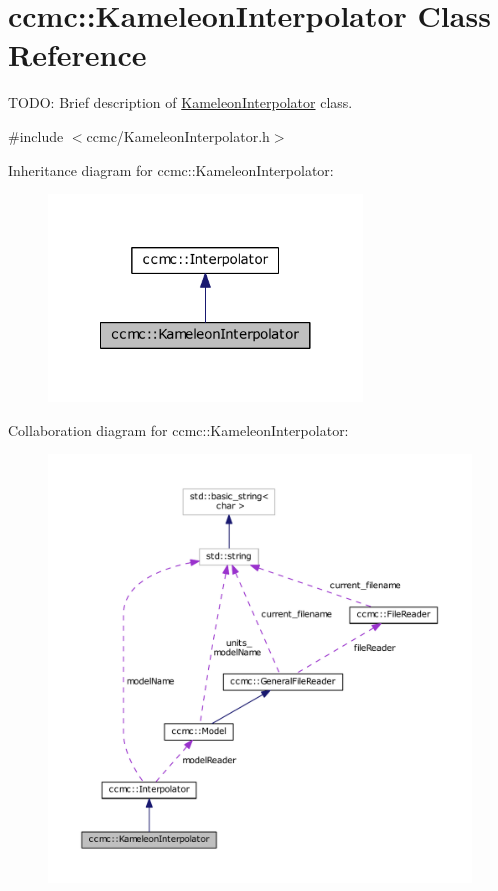 \hypertarget{classccmc_1_1_kameleon_interpolator}{\section{ccmc\-:\-:Kameleon\-Interpolator Class Reference}
\label{classccmc_1_1_kameleon_interpolator}
}


T\-O\-D\-O\-: Brief description of \hyperlink{classccmc_1_1_kameleon_interpolator}{Kameleon\-Interpolator} class.  




{\ttfamily \#include $<$ccmc/\-Kameleon\-Interpolator.\-h$>$}



Inheritance diagram for ccmc\-:\-:Kameleon\-Interpolator\-:\nopagebreak
\begin{figure}[H]
\begin{center}
\leavevmode
\includegraphics[width=236pt]{classccmc_1_1_kameleon_interpolator__inherit__graph}
\end{center}
\end{figure}


Collaboration diagram for ccmc\-:\-:Kameleon\-Interpolator\-:\nopagebreak
\begin{figure}[H]
\begin{center}
\leavevmode
\includegraphics[width=350pt]{classccmc_1_1_kameleon_interpolator__coll__graph}
\end{center}
\end{figure}
